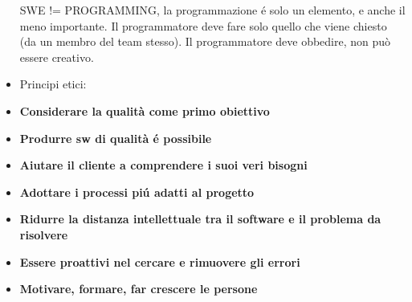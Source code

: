 \documentclass[a4paper,10pt] {article}
\begin{document}
\begin{itemize}
SWE != PROGRAMMING, la programmazione é solo un elemento, e anche il meno
importante. Il
programmatore deve fare solo quello che viene chiesto (da un membro del team
stesso). Il programmatore
deve obbedire, non può essere creativo.


\item Principi etici:
\item \textbf{Considerare la qualità come primo obiettivo}
\item \textbf{Produrre sw di qualità é possibile}
\item \textbf{Aiutare il cliente a comprendere i suoi veri bisogni}
\item \textbf{Adottare i processi pi\'u adatti al progetto}
\item \textbf{Ridurre la distanza intellettuale tra il software e il problema da
risolvere}
\item \textbf{Essere proattivi nel cercare e rimuovere gli errori}
\item \textbf{Motivare, formare, far crescere le persone}

\end {itemize}
\end{document}
